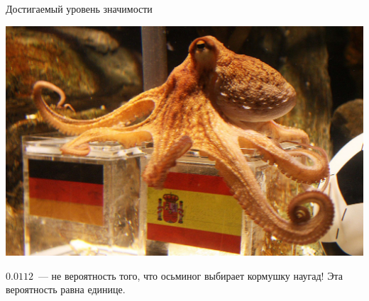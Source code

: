 \documentclass[9pt,pdf,utf8,hyperref={unicode},aspectratio=169]{beamer}
\begin{document}
\begin{frame}{Достигаемый уровень значимости}
\begin{center}
	\includegraphics[height=0.35\textheight]{pauloctopus.png}
\end{center}

\bigskip

$0.0112$~--- не вероятность того, что осьминог выбирает кормушку наугад! Эта вероятность равна единице.
\end{frame}
\end{document}
